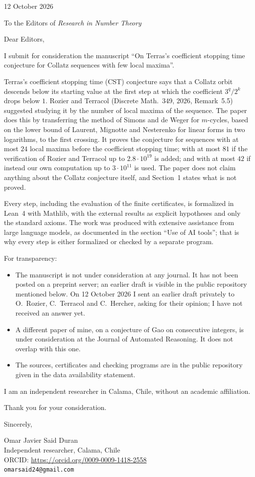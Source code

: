 \documentclass[11pt]{article}
\begin{document}
\hfill 12 October 2026

To the Editors of \emph{Research in Number Theory}

Dear Editors,

I submit for consideration the manuscript ``On Terras's coefficient stopping time conjecture for Collatz sequences with few local maxima''.

Terras's coefficient stopping time (CST) conjecture says that a Collatz orbit descends below its starting value at the first step at which the coefficient $3^{q}/2^{k}$ drops below $1$. Rozier and Terracol (Discrete Math.\ 349, 2026, Remark~5.5) suggested studying it by the number of local maxima of the sequence. The paper does this by transferring the method of Simons and de Weger for $m$-cycles, based on the lower bound of Laurent, Mignotte and Nesterenko for linear forms in two logarithms, to the first crossing. It proves the conjecture for sequences with at most $24$ local maxima before the coefficient stopping time; with at most $81$ if the verification of Rozier and Terracol up to $2.8\cdot10^{19}$ is added; and with at most $42$ if instead our own computation up to $3\cdot10^{11}$ is used. The paper does not claim anything about the Collatz conjecture itself, and Section~1 states what is not proved.

Every step, including the evaluation of the finite certificates, is formalized in Lean~4 with Mathlib, with the external results as explicit hypotheses and only the standard axioms. The work was produced with extensive assistance from large language models, as documented in the section ``Use of AI tools''; that is why every step is either formalized or checked by a separate program.

For transparency:
\begin{itemize}
\item The manuscript is not under consideration at any journal. It has not been posted on a preprint server; an earlier draft is visible in the public repository mentioned below. On 12 October 2026 I sent an earlier draft privately to O.~Rozier, C.~Terracol and C.~Hercher, asking for their opinion; I have not received an answer yet.
\item A different paper of mine, on a conjecture of Gao on consecutive integers, is under consideration at the Journal of Automated Reasoning. It does not overlap with this one.
\item The sources, certificates and checking programs are in the public repository given in the data availability statement.
\end{itemize}

I am an independent researcher in Calama, Chile, without an academic affiliation.

Thank you for your consideration.

Sincerely,

Omar Javier Said Duran\\
Independent researcher, Calama, Chile\\
ORCID: \url{https://orcid.org/0009-0009-1418-2558}\\
\texttt{omarsaid24@gmail.com}
\end{document}
